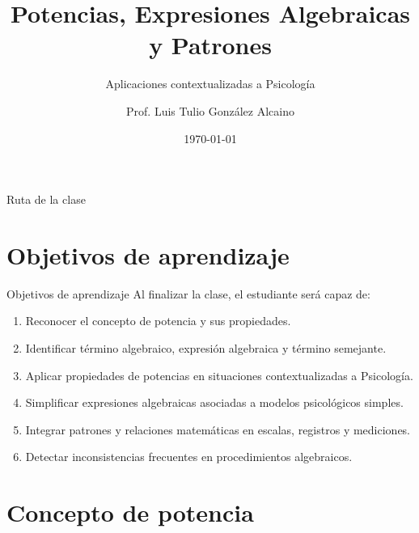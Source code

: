 \documentclass[aspectratio=169]{beamer}
\title[Potencias y Álgebra]{Potencias, Expresiones Algebraicas y Patrones}
\subtitle{Aplicaciones contextualizadas a Psicología}
\author{Prof. Luis Tulio González Alcaino}
\institute{Universidad Santo Tomás \\ Departamento de Ciencias Básicas}
\date{\today}
\begin{document}
	
	\begin{frame}
		\titlepage
	\end{frame}
	
	
	\begin{frame}{Ruta de la clase}
		\tableofcontents
	\end{frame}
	
	\section{Objetivos de aprendizaje}
	
	\begin{frame}{Objetivos de aprendizaje}
		Al finalizar la clase, el estudiante será capaz de:
		
		\begin{enumerate}
			\item Reconocer el concepto de potencia y sus propiedades.
			\item Identificar término algebraico, expresión algebraica y término semejante.
			\item Aplicar propiedades de potencias en situaciones contextualizadas a Psicología.
			\item Simplificar expresiones algebraicas asociadas a modelos psicológicos simples.
			\item Integrar patrones y relaciones matemáticas en escalas, registros y mediciones.
			\item Detectar inconsistencias frecuentes en procedimientos algebraicos.
		\end{enumerate}
	\end{frame}
	
	\section{Concepto de potencia}
	
\end{document}
